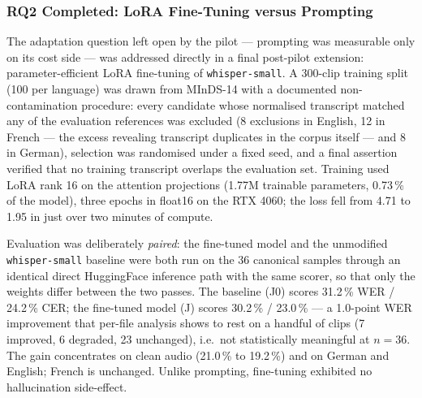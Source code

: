\documentclass[12pt]{report}
\begin{document}
\subsubsection{RQ2 Completed: LoRA Fine-Tuning versus Prompting}

The adaptation question left open by the pilot --- prompting was measurable only on its cost side --- was addressed directly in a final post-pilot extension: parameter-efficient LoRA fine-tuning of \texttt{whisper-small}. A 300-clip training split (100 per language) was drawn from MInDS-14 with a documented non-contamination procedure: every candidate whose normalised transcript matched any of the evaluation references was excluded (8 exclusions in English, 12 in French --- the excess revealing transcript duplicates in the corpus itself --- and 8 in German), selection was randomised under a fixed seed, and a final assertion verified that no training transcript overlaps the evaluation set. Training used LoRA rank 16 on the attention projections (1.77M trainable parameters, 0.73\,\% of the model), three epochs in float16 on the RTX 4060; the loss fell from 4.71 to 1.95 in just over two minutes of compute.

Evaluation was deliberately \emph{paired}: the fine-tuned model and the unmodified \texttt{whisper-small} baseline were both run on the 36 canonical samples through an identical direct HuggingFace inference path with the same scorer, so that only the weights differ between the two passes. The baseline (J0) scores 31.2\,\% WER / 24.2\,\% CER; the fine-tuned model (J) scores 30.2\,\% / 23.0\,\% --- a 1.0-point WER improvement that per-file analysis shows to rest on a handful of clips (7 improved, 6 degraded, 23 unchanged), i.e.\ not statistically meaningful at $n=36$. The gain concentrates on clean audio (21.0\,\% to 19.2\,\%) and on German and English; French is unchanged. Unlike prompting, fine-tuning exhibited no hallucination side-effect.
\end{document}
